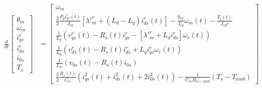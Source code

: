 \documentclass[a4paper, 10pt, journal]{ieeeconf}
\begin{document}
\begin{multicols}{2}
    \begin{align*}
        \frac{d}{dt} \begin{bmatrix} \theta_m \\ \omega_m \\ i^r_{qs} \\ i^r_{ds} \\ i_{0s} \\ T_s \end{bmatrix} &= \begin{bmatrix} \omega_m \\ \frac{3}{2} \frac{P_p i^r_{qs}(t)}{J_{eq}} \left[ \lambda'^r_{m} + (L_d - L_q) i^r_{ds}(t) \right] - \frac{b_{eq}}{J_{eq}} \omega_m(t) - \frac{T_l(t)}{J_{eq}r} \\ \frac{1}{L_q} \left( v^r_{qs}(t) - R_s(t) i^r_{qs} - [\lambda'^r_m + L_d i^r_{ds}] \omega_r(t) \right) \\ \frac{1}{L_d} \left( v^r_{ds}(t) - R_s(t) i^r_{ds} + L_q i^r_{qs} \omega_r(t) \right) \\ \frac{1}{L_{ls}} \left( v_{0s}(t) - R_s(t) i_{0s} \right) \\ \frac{3}{2} \frac{R_s(t)}{C_{ts}} \left( i_{qs}^2(t) + i_{ds}^2(t) + 2 i_{0s}^2(t) \right) - \frac{1}{C_{ts}R_{ts-amb}} (T_s - T_{amb}) \end{bmatrix}
    \end{align*}
\end{multicols}
\end{document}
